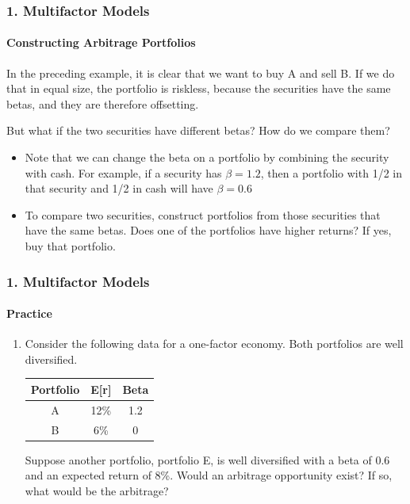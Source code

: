 \documentclass{beamer}
\begin{document}
\begin{frame}[t]
    \frametitle{1. Multifactor Models}
    \framesubtitle{Constructing Arbitrage Portfolios}

    In the preceding example, it is clear that we want to buy A and sell B.   If we do that in equal size, the portfolio is riskless, because the securities have the same betas, and they are therefore offsetting.
    \vspace{1em}

    But what if the two securities have different betas?   How do we compare them?
    \begin{itemize}
        \item Note that we can change the beta on a portfolio by combining the security with cash.  For example, if a security has $\beta = 1.2$, then a portfolio with 1/2 in that security and 1/2 in cash will have $\beta=0.6$ 
        \item To compare two securities, construct portfolios from those securities that have the same betas.  Does one of the portfolios have higher returns?   If yes, buy that portfolio.  
    \end{itemize}

\end{frame}


\begin{practiceframe}[t]
    \frametitle{1. Multifactor Models}
    \framesubtitle{Practice}

        \begin{enumerate}
            \item Consider the following data for a one-factor economy.   Both portfolios are 
            well diversified.
            \begin{table}
                \begin{tabular}{ccc}
                    \toprule
                    Portfolio & E[r] & Beta\\
                    \midrule
                    A & 12\% & 1.2\\
                    B & 6\% & 0\\
                    \bottomrule
                \end{tabular}
            \end{table}
            Suppose another portfolio, portfolio E, is well diversified with a beta of 0.6 and 
            an expected return of 8\%.  Would an arbitrage opportunity exist?   If so, what would be the 
            arbitrage?
        \end{enumerate}

\end{practiceframe}
\end{document}
